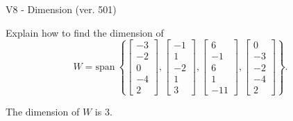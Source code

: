 \begin{exercise}
  \begin{exerciseTitle}V8 - Dimension (ver. 501)\end{exerciseTitle}
  \begin{exerciseStatement}
    Explain how to find the dimension of 
\[W=\mathrm{span}\ \left\{\left[\begin{array}{r}
-3 \\
-2 \\
0 \\
-4 \\
2
\end{array}\right] , \left[\begin{array}{r}
-1 \\
1 \\
-2 \\
1 \\
3
\end{array}\right] , \left[\begin{array}{r}
6 \\
-1 \\
6 \\
1 \\
-11
\end{array}\right] , \left[\begin{array}{r}
0 \\
-3 \\
-2 \\
-4 \\
2
\end{array}\right]\right\}.\]



  \end{exerciseStatement}
  \begin{exerciseAnswer}
   The dimension of \(W\) is  \(3\).
  


  \end{exerciseAnswer}
\end{exercise}